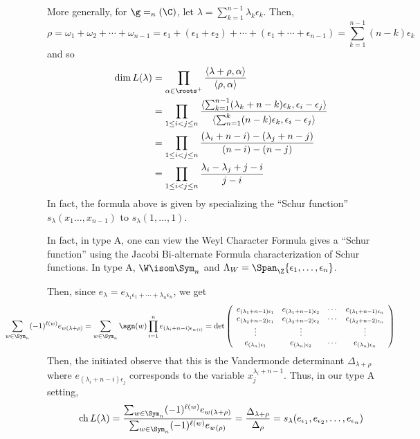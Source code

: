 \documentclass[11pt,leqno,oneside]{amsart}
\numberwithin{thm}{section}
\newcommand{\weightlattice}{\Lambda_W}
\newcommand{\ch}{\operatorname{ch}}
\newcommand{\halfsum}{\rho}
\begin{document}
\begin{example}
  More generally, for \(\g = \sl_n(\C)\), let \(\lambda =
  \sum_{k=1}^{n-1} \lambda_k \epsilon_k\). Then, \[
    \halfsum = \omega_1 + \omega_2 + \cdots + \omega_{n-1} = \epsilon_1 +
    (\epsilon_1+\epsilon_2) + \cdots + (\epsilon_1 + \cdots +
    \epsilon_{n-1}) = \sum_{k=1}^{n-1} (n-k) \epsilon_k
  \]
  and so
  \begin{align*}
    \dim L(\lambda)
    & = \prod_{\alpha \in \roots^+} \frac{\langle
      \lambda+\halfsum,\alpha \rangle}{\langle \halfsum,\alpha
      \rangle}\\
    & = \prod_{1 \leq i < j \leq n} \frac{\langle \sum_{k=1}^{n-1}
      (\lambda_k+n-k)\epsilon_k, \epsilon_i-\epsilon_j
      \rangle}{\langle \sum_{n=1}^k (n-k) \epsilon_k,
      \epsilon_i-\epsilon_j \rangle}\\
    & = \prod_{1 \leq i < j \leq n}
      \frac{(\lambda_i+n-i)-(\lambda_j+n-j)}{(n-i)-(n-j)} \\
    & = \prod_{1 \leq i < j \leq n} \frac{\lambda_i-\lambda_j+j-i}{j-i}
  \end{align*}
  In fact, the formula above is given by specializing the ``Schur
  function'' \(s_\lambda(x_1 \ldots, x_{n-1})\) to
  \(s_\lambda(1,\ldots,1)\). 
\end{example}
\begin{rmk}
  In fact, in type A, one can view the Weyl Character Formula gives a
  ``Schur function'' using the Jacobi Bi-alternate Formula
  characterization of Schur functions. In type A, \(\W \isom
  \Sym_n\) and \(\weightlattice = \Span_\Z\{\epsilon_1, \ldots,
  \epsilon_n\}\). 

  Then, since \(e_{\lambda} = e_{\lambda_1 \epsilon_1 + \cdots +
    \lambda_n \epsilon_n}\), we get \[
    \hspace{-0.75in} \sum_{w \in \Sym_n} (-1)^{\ell(w)} e_{w(\lambda+\rho)}
    = \sum_{w \in \Sym_n} \sgn(w) \prod_{i=1}^n
    e_{(\lambda_i+n-i)\epsilon_{w(i)}} = \det \left(
      \begin{array}{cccc}
        e_{(\lambda_1+n-1)\epsilon_1}&e_{(\lambda_1+n-1)\epsilon_2}&\cdots
        &e_{(\lambda_1+n-1)\epsilon_n}\\
        e_{(\lambda_2+n-2)\epsilon_1}&e_{(\lambda_2+n-2)\epsilon_2}&\cdots
        &e_{(\lambda_2+n-2)\epsilon_n}\\
        \vdots&\vdots&&\vdots\\
        e_{(\lambda_n)\epsilon_1}&e_{(\lambda_n)\epsilon_2}&\cdots
        &e_{(\lambda_n)\epsilon_n}
      \end{array}
    \right)
\]
Then, the initiated observe that this is the Vandermonde determinant
\(\Delta_{\lambda+\rho}\) where \(e_{(\lambda_i+n-i)\epsilon_j}\)
corresponds to the variable \(x_j^{\lambda_i+n-1}\). Thus, in our type
A setting, \[
\ch L(\lambda) = \frac{\sum_{w \in \Sym_n} (-1)^{\ell(w)} e_{w(\lambda+\rho)}}{\sum_{w
    \in \Sym_n} (-1)^{\ell(w)} e_{w(\rho)}} =
\frac{\Delta_{\lambda+\rho}}{\Delta_{\rho}} =
s_\lambda(e_{\epsilon_1}, e_{\epsilon_2}, \ldots, e_{\epsilon_n})
\]
\end{rmk}
\end{document}
